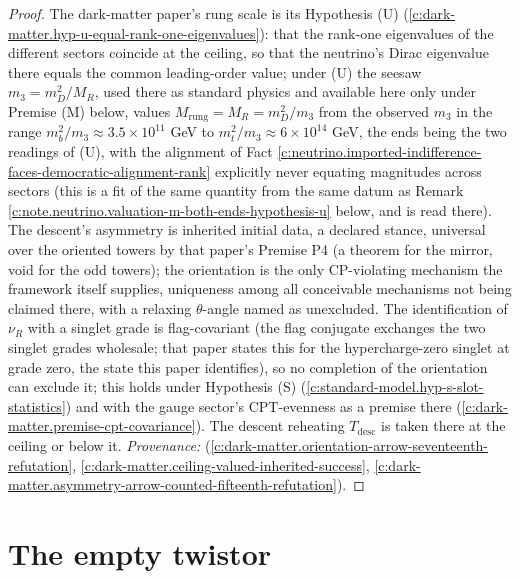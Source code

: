 \documentclass[11pt]{article}
\theoremstyle{definition}
\theoremstyle{plain}
\begin{document}
\begin{proof}
The dark-matter paper's rung scale is its Hypothesis (U) (\ref{c:dark-matter.hyp-u-equal-rank-one-eigenvalues}): that the rank-one eigenvalues of the different sectors coincide at the ceiling, so that the neutrino's Dirac eigenvalue there equals the common leading-order value; under (U) the seesaw $m_{3} = m_{D}^{2}/M_{R}$, used there as standard physics and available here only under Premise (M) below, values $M_{\mathrm{rung}} = M_{R} = m_{D}^{2}/m_{3}$ from the observed $m_{3}$ in the range $m_{b}^{2}/m_{3} \approx 3.5 \times 10^{11}$ GeV to $m_{t}^{2}/m_{3} \approx 6 \times 10^{14}$ GeV, the ends being the two readings of (U), with the alignment of Fact \ref{c:neutrino.imported-indifference-faces-democratic-alignment-rank} explicitly never equating magnitudes across sectors (this is a fit of the same quantity from the same datum as Remark \ref{c:note.neutrino.valuation-m-both-ends-hypothesis-u} below, and is read there). The descent's asymmetry is inherited initial data, a declared stance, universal over the oriented towers by that paper's Premise P4 (a theorem for the mirror, void for the odd towers); the orientation is the only CP-violating mechanism the framework itself supplies, uniqueness among all conceivable mechanisms not being claimed there, with a relaxing $\theta$-angle named as unexcluded. The identification of $\nu_{R}$ with a singlet grade is flag-covariant (the flag conjugate exchanges the two singlet grades wholesale; that paper states this for the hypercharge-zero singlet at grade zero, the state this paper identifies), so no completion of the orientation can exclude it; this holds under Hypothesis (S) (\ref{c:standard-model.hyp-s-slot-statistics}) and with the gauge sector's CPT-evenness as a premise there (\ref{c:dark-matter.premise-cpt-covariance}). The descent reheating $T_{\mathrm{desc}}$ is taken there at the ceiling or below it. \emph{Provenance:} \cite[Prop.~6.4, Prop.~5.1, Prop.~5.2, App.~A]{ButlerT14} (\ref{c:dark-matter.orientation-arrow-seventeenth-refutation}, \ref{c:dark-matter.ceiling-valued-inherited-success}, \ref{c:dark-matter.asymmetry-arrow-counted-fifteenth-refutation}).

\end{proof}

\section{The empty twistor}
\end{document}
